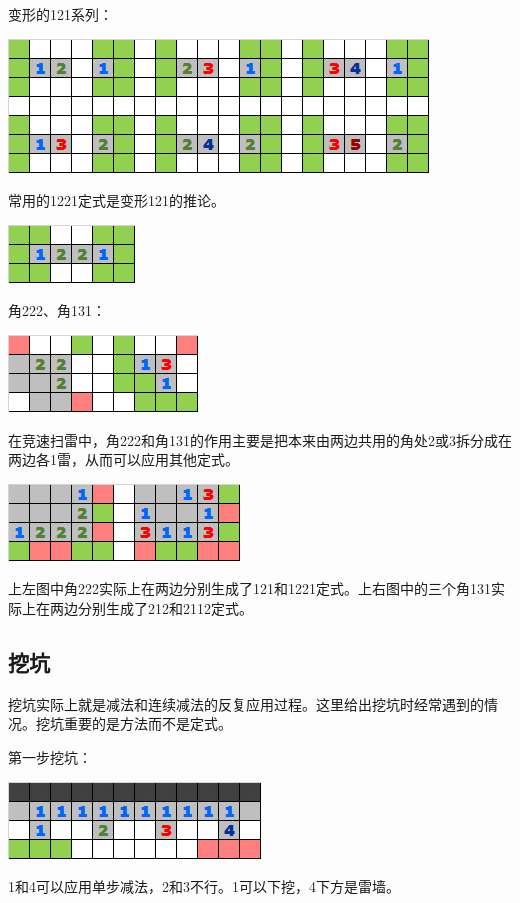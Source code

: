 \vspace{5mm}变形的121系列：
\begin{center}
    \includegraphics[scale=0.6]{game/定式4.png}
\end{center}
常用的1221定式是变形121的推论。
\begin{center}
    \includegraphics[scale=0.6]{game/定式7.png}
\end{center}

\vspace{5mm}角222、角131：
\begin{center}
    \includegraphics[scale=0.6]{game/定式5.png}
\end{center}
在竞速扫雷中，角222和角131的作用主要是把本来由两边共用的角处2或3拆分成在两边各1雷，从而可以应用其他定式。
\begin{center}
    \includegraphics[scale=0.6]{game/定式8.png}
\end{center}
上左图中角222实际上在两边分别生成了121和1221定式。上右图中的三个角131实际上在两边分别生成了212和2112定式。

\subsection{挖坑}
挖坑实际上就是减法和连续减法的反复应用过程。这里给出挖坑时经常遇到的情况。挖坑重要的是方法而不是定式。

\vspace{5mm}第一步挖坑：
\begin{center}
    \includegraphics[scale=0.6]{game/挖坑1.png}
\end{center}
1和4可以应用单步减法，2和3不行。1可以下挖，4下方是雷墙。

